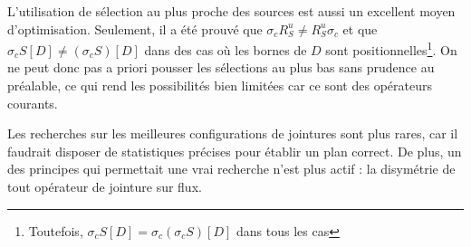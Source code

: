L'utilisation de sélection au plus proche des sources est aussi un excellent moyen d'optimisation. Seulement, il a été prouvé que $\sigma_c R_S^u \neq R_S^u \sigma_c$ et que $\sigma_c S[D] \neq (\sigma_c S)[D]$ dans des cas où les bornes de $D$ sont positionnelles\footnote{Toutefois, $\sigma_c S[D] = \sigma_c (\sigma_c S)[D]$ dans tous les cas}. On ne peut donc pas a priori pousser les sélections au plus bas sans prudence au préalable, ce qui rend les possibilités bien limitées car ce sont des opérateurs courants.

Les recherches sur les meilleures configurations de jointures sont plus rares, car il faudrait disposer de statistiques précises pour établir un plan correct. De plus, un des principes qui permettait une vrai recherche n'est plus actif : la disymétrie de tout opérateur de jointure sur flux. 
